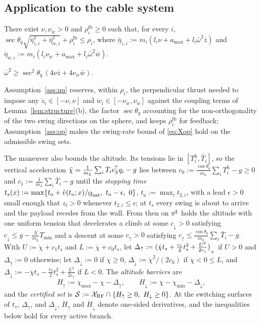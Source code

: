\subsection{Application to the cable system}\label{sec:cable}

\begin{assumption}\label{ass:nu}
There exist $\nu,\nu_w>0$ and $\rho_i^{\mathrm{fb}}\ge0$ such that, for every $i$, $\sec\theta_q\sqrt{\bar\eta_{z,i}^2+\bar\eta_{w,i}^2}+\rho_i^{\mathrm{fb}}\le\rho_i$, where $\bar\eta_{z,i}:=m_i(l_i\nu+a_{\max}+l_i\bar\omega^2\bar z)$ and $\bar\eta_{w,i}:=m_i(l_i\nu_w+a_{\max}+l_i\bar\omega^2\bar w)$.
\end{assumption}

\begin{assumption}\label{ass:op}
$\bar\omega^2\ge\sec^2\theta_q\,(4\nu\bar z+4\nu_w\bar w)$.
\end{assumption}

Assumption~\ref{ass:nu} reserves, within $\rho_i$, the perpendicular thrust needed to impose any $\ddot z_i\in[-\nu,\nu]$ and $\ddot w_i\in[-\nu_w,\nu_w]$ against the coupling terms of Lemma~\ref{lem:structure}(b), the factor $\sec\theta_q$ accounting for the non-orthogonality of the two swing directions on the sphere, and keeps $\rho_i^{\mathrm{fb}}$ for feedback; Assumption~\ref{ass:op} makes the swing-rate bound of \eqref{eq:Xop} hold on the admissible swing sets.

The maneuver also bounds the altitude. Its tensions lie in $[T^{\mathrm h}_i,\bar T_i]$, so the vertical acceleration $\ddot\chi=\frac{1}{m_L}\sum_iT_ie_3^{\!\top} q_i-g$ lies between $c_0:=\frac{\cos\theta_q}{m_L}\sum_iT^{\mathrm h}_i-g\ge0$ and $c_1:=\frac{1}{m_L}\sum_i\bar T_i-g$ until the \emph{stopping time} $t_s(x):=\max\{t_a+\tilde v(t_a;x)/\underline{\alpha}_{\mathrm{sat}},\ t_a-\epsilon,\ 0\}$, $t_a:=\max_it_{2,i}$, with a lead $\epsilon>0$ small enough that $z_i>0$ whenever $t_{2,i}\le\epsilon$; at $t_s$ every swing is about to arrive and the payload recedes from the wall. From then on $\pi^{\sharp}$ holds the altitude with one uniform tension that decelerates a climb at some $c_\downarrow>0$ satisfying $c_\downarrow\le g-\frac{N}{m_L}T_{\min}$ and a descent at some $c_\uparrow>0$ satisfying $c_\uparrow\le\frac{\cos\theta_q}{m_L}\sum_i\bar T_i-g$. With $U:=\dot\chi+c_1t_s$ and $L:=\dot\chi+c_0t_s$, let $\Delta_\uparrow:={(\dot\chi t_s+\tfrac{c_1}{2}t_s^2+\tfrac{U^2}{2c_\downarrow})}_{+}$ if $U>0$ and $\Delta_\uparrow:=0$ otherwise; let $\Delta_\downarrow:=0$ if $\dot\chi\ge0$, $\Delta_\downarrow:=\dot\chi^2/(2c_0)$ if $\dot\chi<0\le L$, and $\Delta_\downarrow:=-\dot\chi t_s-\tfrac{c_0}{2}t_s^2+\tfrac{L^2}{2c_\uparrow}$ if $L<0$. The \emph{altitude barriers} are
\[
H_\uparrow:=\chi_{\max}-\chi-\Delta_\uparrow,\qquad H_\downarrow:=\chi-\chi_{\min}-\Delta_\downarrow,
\]
and the \emph{certified set} is $\mathcal{S}:=\Xrf\cap\{H_\uparrow\ge0,\ H_\downarrow\ge0\}$. At the switching surfaces of $t_s$, $\Delta_\uparrow$, and $\Delta_\downarrow$, $\dot H_\uparrow$ and $\dot H_\downarrow$ denote one-sided derivatives, and the inequalities below hold for every active branch.

